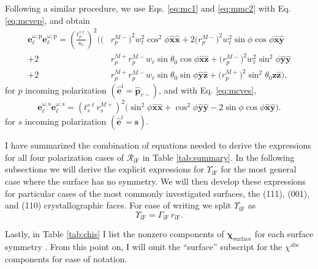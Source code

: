 Following a similar procedure, we use Eqs. \eqref{eq:mc1} and \eqref{eq:mmc2}
with Eq. \eqref{eq:mcvep}, and obtain
\begin{equation}\label{eq:ewewpmr}
\begin{split}
\mathbf{e}^{\omega,\mathrm{p}}_{\ell}\mathbf{e}^{\omega,\mathrm{p}}_{\ell} =
\left(\frac{t^{v\ell}_{p}}{n_{\ell}}\right)^{2}
\bigg(
  \big(&r^{M-}_{p}\big)^{2}w^{2}_{\ell}\cos^{2}\phi
  \hat{\mathbf{x}}\hat{\mathbf{x}}
+ 2\big(r^{M-}_{p}\big)^{2}w^{2}_{\ell}\sin\phi\cos\phi
  \hat{\mathbf{x}}\hat{\mathbf{y}}\\
+ 2&r^{M+}_{p}r^{M-}_{p}w_{\ell}\sin\theta_{0}\cos\phi
  \hat{\mathbf{x}}\hat{\mathbf{z}}
+ \big(r^{M-}_{p}\big)^{2}w^{2}_{\ell}\sin^{2}\phi
  \hat{\mathbf{y}}\hat{\mathbf{y}}\\
+ 2&r^{M+}_{p}r^{M-}_{p}w_{\ell}\sin\theta_{0}\sin\phi
  \hat{\mathbf{y}}\hat{\mathbf{z}}
+ \big(r^{M+}_{p}\big)^{2}\sin^{2}\theta_{0}
   \hat{\mathbf{z}}\hat{\mathbf{z}}
\bigg),
\end{split}
\end{equation}
for $p$ incoming polarization $(\hat{\mathbf{e}}^{\mathrm{i}} =
\hat{\mathbf{p}}_{v-})$, and with Eq. \eqref{eq:mcves},
\begin{equation}\label{eq:ewewsmr}
\mathbf{e}^{\omega,\mathrm{s}}_{\ell}\mathbf{e}^{\omega,\mathrm{s}}_{\ell}
= \left(t^{v\ell}_{s}r^{M+}_{s}\right)^{2}
\big(
  \sin^{2}\phi\hat{\mathbf{x}}\hat{\mathbf{x}}
 + \cos^{2}\phi\hat{\mathbf{y}}\hat{\mathbf{y}}
 - 2\sin\phi\cos\phi\hat{\mathbf{x}}\hat{\mathbf{y}}
\big).
\end{equation}
for $s$ incoming polarization $(\hat{\mathbf{e}}^{\mathrm{i}} =
\hat{\mathbf{s}})$.

I have summarized the combination of equations needed to derive the expressions
for all four polarization cases of $\mathcal{R}_{\mathrm{iF}}$ in Table
\ref{tab:summary}. In the following subsections we will derive the explicit
expressions for $\Upsilon_{\mathrm{iF}}$ for the most general case where the
surface has no symmetry. We will then develop these expressions for particular
cases of the most commonly investigated surfaces, the (111), (001), and (110)
crystallographic faces. For ease of writing we split $\Upsilon_{\mathrm{iF}}$ as
\begin{equation}\label{eq:mc25}
\Upsilon_{\mathrm{iF}} = \Gamma_{\mathrm{iF}}\,r_{\mathrm{iF}}.
\end{equation} 

Lastly, in Table \ref{tab:chis} I list the nonzero components of
$\boldsymbol{\chi}_{\mathrm{surface}}$ for each surface symmetry
\cite{sipePRB87, popovbook}. From this point on, I will omit the ``surface''
subscript for the $\chi^{\mathrm{abc}}$ components for ease of notation.

